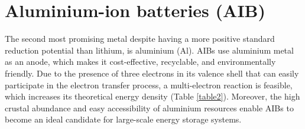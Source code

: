 \section{Aluminium-ion batteries (AIB)}
The second most promising metal despite having a more positive standard reduction potential than lithium, is aluminium (Al). AIBs use aluminium metal as an anode, which makes it cost-effective, recyclable, and environmentally friendly. Due to the presence of three electrons in its valence shell that can easily participate in the electron transfer process, a multi-electron reaction is feasible, which increases its theoretical energy density (Table \ref{table2}). Moreover, the high crustal abundance and easy accessibility of aluminium resources enable AIBs to become an ideal candidate for large-scale energy storage systems. \\
